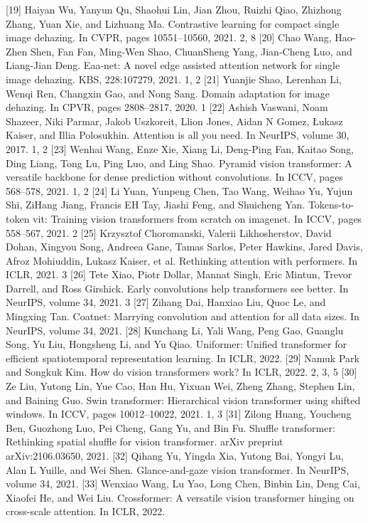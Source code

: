 [19] Haiyan Wu, Yanyun Qu, Shaohui Lin, Jian Zhou, Ruizhi Qiao, Zhizhong Zhang, Yuan Xie, and Lizhuang Ma. Contrastive learning for compact single image dehazing. In CVPR, pages 10551–10560, 2021. 2, 8
[20] Chao Wang, Hao-Zhen Shen, Fan Fan, Ming-Wen Shao, ChuanSheng Yang, Jian-Cheng Luo, and Liang-Jian Deng. Eaa-net: A novel edge assisted attention network for single image dehazing. KBS, 228:107279, 2021. 1, 2
[21] Yuanjie Shao, Lerenhan Li, Wenqi Ren, Changxin Gao, and Nong Sang. Domain adaptation for image dehazing. In CPVR, pages 2808–2817, 2020. 1
[22] Ashish Vaswani, Noam Shazeer, Niki Parmar, Jakob Uszkoreit, Llion Jones, Aidan N Gomez, Łukasz Kaiser, and Illia Polosukhin. Attention is all you need. In NeurIPS, volume 30, 2017. 1, 2
[23] Wenhai Wang, Enze Xie, Xiang Li, Deng-Ping Fan, Kaitao Song, Ding Liang, Tong Lu, Ping Luo, and Ling Shao. Pyramid vision transformer: A versatile backbone for dense prediction without convolutions. In ICCV, pages 568–578, 2021. 1, 2
[24] Li Yuan, Yunpeng Chen, Tao Wang, Weihao Yu, Yujun Shi, ZiHang Jiang, Francis EH Tay, Jiashi Feng, and Shuicheng Yan. Tokens-to-token vit: Training vision transformers from scratch on imagenet. In ICCV, pages 558–567, 2021. 2
[25] Krzysztof Choromanski, Valerii Likhosherstov, David Dohan, Xingyou Song, Andreea Gane, Tamas Sarlos, Peter Hawkins, Jared Davis, Afroz Mohiuddin, Lukasz Kaiser, et al. Rethinking attention with performers. In ICLR, 2021. 3
[26] Tete Xiao, Piotr Dollar, Mannat Singh, Eric Mintun, Trevor Darrell, and Ross Girshick. Early convolutions help transformers see better. In NeurIPS, volume 34, 2021. 3
[27] Zihang Dai, Hanxiao Liu, Quoc Le, and Mingxing Tan. Coatnet: Marrying convolution and attention for all data sizes. In NeurIPS, volume 34, 2021.
[28] Kunchang Li, Yali Wang, Peng Gao, Guanglu Song, Yu Liu, Hongsheng Li, and Yu Qiao. Uniformer: Unified transformer for efficient spatiotemporal representation learning. In ICLR, 2022.
[29] Namuk Park and Songkuk Kim. How do vision transformers work? In ICLR, 2022. 2, 3, 5
[30] Ze Liu, Yutong Lin, Yue Cao, Han Hu, Yixuan Wei, Zheng Zhang, Stephen Lin, and Baining Guo. Swin transformer: Hierarchical vision transformer using shifted windows. In ICCV, pages 10012–10022, 2021. 1, 3
[31] Zilong Huang, Youcheng Ben, Guozhong Luo, Pei Cheng, Gang Yu, and Bin Fu. Shuffle transformer: Rethinking spatial shuffle for vision transformer. arXiv preprint arXiv:2106.03650, 2021.
[32] Qihang Yu, Yingda Xia, Yutong Bai, Yongyi Lu, Alan L Yuille, and Wei Shen. Glance-and-gaze vision transformer. In NeurIPS, volume 34, 2021.
[33] Wenxiao Wang, Lu Yao, Long Chen, Binbin Lin, Deng Cai, Xiaofei He, and Wei Liu. Crossformer: A versatile vision transformer hinging on cross-scale attention. In ICLR, 2022.
